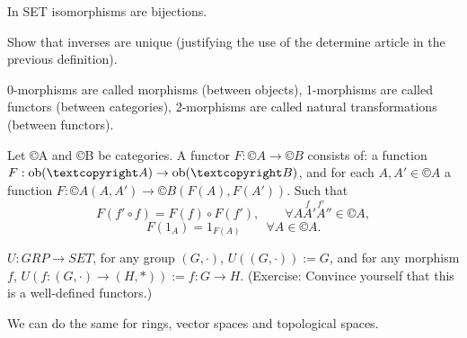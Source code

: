 \documentclass[12pt]{article}					%
\begin{document}
\begin{priklady}
	In SET isomorphisms are bijections.
\end{priklady}

\begin{priklad}
	Show that inverses are unique (justifying the use of the determine article in the previous definition).
\end{priklad}

\begin{poznamka}
	0-morphisms are called morphisms (between objects), 1-morphisms are called functors (between categories), 2-morphisms are called natural transformations (between functors).
\end{poznamka}

\begin{definice}[Functor]
	Let ©A and ©B be categories. A functor $F: ©A \rightarrow ©B$ consists of: a function $F: \ob(©A) \rightarrow \ob(©B)$, and for each $A, A' \in ©A$ a function $F: ©A(A, A') \rightarrow ©B(F(A), F(A'))$. Such that
	$$ F(f' ∘ f) = F(f) ∘ F(f'), \qquad \forall A \overset{f} A' \overset{f'} A'' \in ©A, $$
	$$ F(1_A) = 1_{F(A)} \qquad \forall A \in ©A. $$
\end{definice}

\begin{priklady}
	$U: GRP \rightarrow SET$, for any group $(G, ·)$, $U((G, ·)) := G$, and for any morphism $f$, $U(f: (G, ·) \rightarrow (H, *)) := f: G \rightarrow H$. (Exercise: Convince yourself that this is a well-defined functors.)
	
	We can do the same for rings, vector spaces and topological spaces.
\end{priklady}

\end{document}
